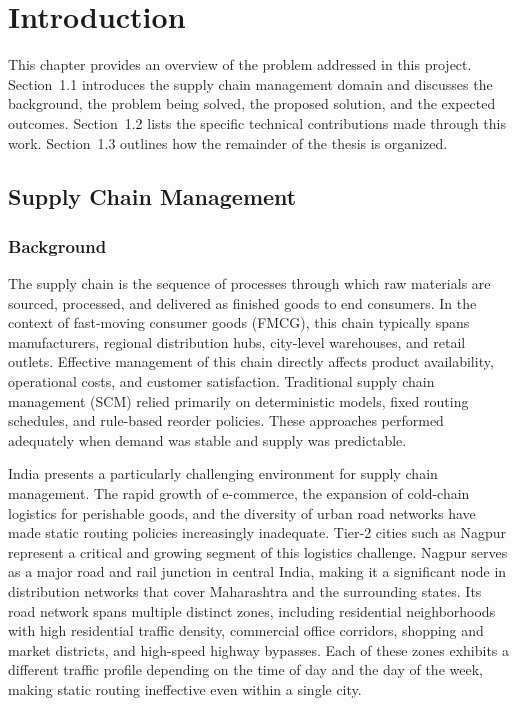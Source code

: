 \chapter{Introduction}

This chapter provides an overview of the problem addressed in this project.
Section~1.1 introduces the supply chain management domain and discusses the
background, the problem being solved, the proposed solution, and the expected
outcomes. Section~1.2 lists the specific technical contributions made through
this work. Section~1.3 outlines how the remainder of the thesis is organized.

\section{Supply Chain Management}

\subsection{Background}

The supply chain is the sequence of processes through which raw materials are
sourced, processed, and delivered as finished goods to end consumers. In the
context of fast-moving consumer goods (FMCG), this chain typically spans
manufacturers, regional distribution hubs, city-level warehouses, and retail
outlets. Effective management of this chain directly affects product availability,
operational costs, and customer satisfaction. Traditional supply chain management
(SCM) relied primarily on deterministic models, fixed routing schedules, and
rule-based reorder policies. These approaches performed adequately when demand
was stable and supply was predictable.

India presents a particularly challenging environment for supply chain management.
The rapid growth of e-commerce, the expansion of cold-chain logistics for
perishable goods, and the diversity of urban road networks have made static
routing policies increasingly inadequate. Tier-2 cities such as Nagpur represent
a critical and growing segment of this logistics challenge. Nagpur serves as a
major road and rail junction in central India, making it a significant node in
distribution networks that cover Maharashtra and the surrounding states. Its road
network spans multiple distinct zones, including residential neighborhoods with
high residential traffic density, commercial office corridors, shopping and market
districts, and high-speed highway bypasses. Each of these zones exhibits a
different traffic profile depending on the time of day and the day of the week,
making static routing ineffective even within a single city.


